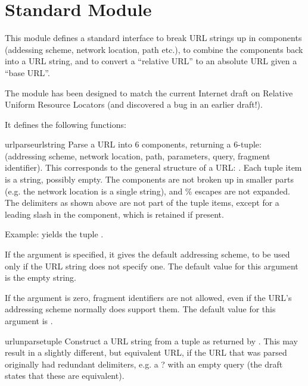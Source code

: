 \section{Standard Module }

\renewcommand{\indexsubitem}{(in module urlparse)}

This module defines a standard interface to break URL strings up in
components (addessing scheme, network location, path etc.), to combine
the components back into a URL string, and to convert a ``relative
URL'' to an absolute URL given a ``base URL''.

The module has been designed to match the current Internet draft on
Relative Uniform Resource Locators (and discovered a bug in an earlier
draft!).

It defines the following functions:

\begin{funcdesc}{urlparse}{urlstring}
Parse a URL into 6 components, returning a 6-tuple: (addressing
scheme, network location, path, parameters, query, fragment
identifier).  This corresponds to the general structure of a URL:
.
Each tuple item is a string, possibly empty.
The components are not broken up in smaller parts (e.g. the network
location is a single string), and \% escapes are not expanded.
The delimiters as shown above are not part of the tuple items,
except for a leading slash in the  component, which is
retained if present.

Example:
yields the tuple
.

If the  argument is specified, it gives the
default addressing scheme, to be used only if the URL string does not
specify one.  The default value for this argument is the empty string.

If the  argument is zero, fragment identifiers
are not allowed, even if the URL's addressing scheme normally does
support them.  The default value for this argument is .
\end{funcdesc}

\begin{funcdesc}{urlunparse}{tuple}
Construct a URL string from a tuple as returned by .
This may result in a slightly different, but equivalent URL, if the
URL that was parsed originally had redundant delimiters, e.g. a ? with
an empty query (the draft states that these are equivalent).
\end{funcdesc}

